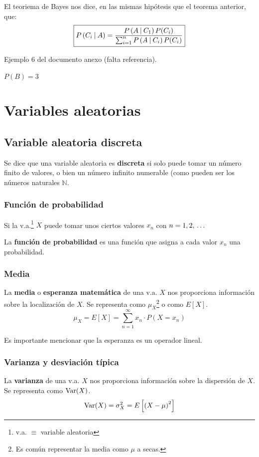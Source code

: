 \documentclass[a4paper]{book}
\begin{document}
\begin{teorema}
	El teoriema de Bayes nos dice, en las mismas hipótesis que el teorema anterior, que: \[\boxed{P \left( C_i \: \middle\vert\: A \right)=\frac{P \left( A \: \middle\vert\: C_1 \right)P(C_i)}{\sum^{n}_{i=1}{P \left( A \: \middle\vert\: C_i \right)P(C_i)}}}\]
\end{teorema}

Ejemplo 6 del documento anexo (falta referencia). %

$P(B) = 3$



\chapter{Variables aleatorias}

\section{Variable aleatoria discreta}
Se dice que una variable aleatoria es \textbf{discreta} si solo puede tomar un número finito de valores, o bien un número infinito numerable (como pueden ser los números naturales $\mathbb{N}$.

\subsection{Función de probabilidad}
Si la v.a.\footnote{v.a. $\equiv$ variable aleatoria} $X$ puede tomar unos ciertos valores $x_n$ con $n=1, 2, \, \ldots \, $

La \textbf{función de probabilidad} es una función que asigna a cada valor $x_n$ una probabilidad.

\subsection{Media}
La \textbf{media} o \textbf{esperanza matemática} de una v.a. $X$ nos proporciona información sobre la localización de $X$. Se representa como $\mu _X$\footnote{Es común representar la media como $\mu$ a secas.} o como $E[X]$.
\[\mu _X = E[X] = \sum^{\infty}_{n=1}{x_n \cdot P(X=x_n)}\]

\begin{nota}
	Es importante mencionar que la esperanza es un operador lineal.
\end{nota}

\subsection{Varianza y desviación típica}
La \textbf{varianza} de una v.a. $X$ nos proporciona información sobre la dispersión de $X$. Se representa como $\operatorname{Var}(X)$.
\[\operatorname{Var}(X) = \sigma_X^2 = E\left[ \left( X-\mu \right)^2 \right]\]
\end{document}
